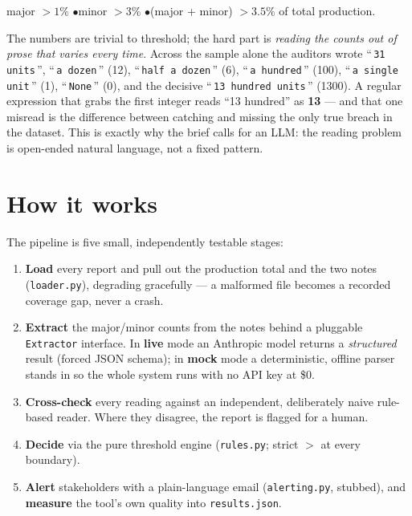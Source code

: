 \documentclass[11pt]{article}
\newcommand{\code}[1]{\texttt{\small #1}}
\begin{document}
\begin{center}\small
major $> 1\%$ \quad$\bullet$\quad minor $> 3\%$ \quad$\bullet$\quad (major + minor) $> 3.5\%$
\quad of total production.
\end{center}

The numbers are trivial to threshold; the hard part is \emph{reading the counts out of
prose that varies every time}. Across the sample alone the auditors wrote
``\,\code{31 units}\,'', ``\,\code{a dozen}\,'' (12), ``\,\code{half a dozen}\,'' (6),
``\,\code{a hundred}\,'' (100), ``\,\code{a single unit}\,'' (1), ``\,\code{None}\,'' (0),
and the decisive ``\,\code{13 hundred units}\,'' (1300). A regular expression that grabs
the first integer reads ``13 hundred'' as \textbf{13} --- and that one misread is the
difference between catching and missing the only true breach in the dataset. This is
exactly why the brief calls for an LLM: the reading problem is open-ended natural
language, not a fixed pattern.

\section{How it works}
The pipeline is five small, independently testable stages:

\begin{enumerate}[leftmargin=1.4em,itemsep=2pt]
  \item \textbf{Load} every report and pull out the production total and the two notes
    (\code{loader.py}), degrading gracefully --- a malformed file becomes a recorded
    coverage gap, never a crash.
  \item \textbf{Extract} the major/minor counts from the notes behind a pluggable
    \code{Extractor} interface. In \textbf{live} mode an Anthropic model returns a
    \emph{structured} result (forced JSON schema); in \textbf{mock} mode a deterministic,
    offline parser stands in so the whole system runs with no API key at \$0.
  \item \textbf{Cross-check} every reading against an independent, deliberately naive
    rule-based reader. Where they disagree, the report is flagged for a human.
  \item \textbf{Decide} via the pure threshold engine (\code{rules.py}; strict $>$ at
    every boundary).
  \item \textbf{Alert} stakeholders with a plain-language email (\code{alerting.py},
    stubbed), and \textbf{measure} the tool's own quality into \code{results.json}.
\end{enumerate}
\end{document}
